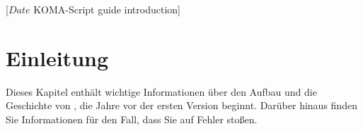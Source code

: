 %
%
%
%
%
%
%
%
% 
%
%
%
%

                 [$Date$
                  KOMA-Script guide introduction]

\chapter{Einleitung}

Dieses Kapitel enthält wichtige Informationen über
den Aufbau  und die Geschichte von
\KOMAScript, die Jahre vor der ersten Version beginnt. Darüber hinaus finden
Sie Informationen für den Fall, dass Sie %
\iffalse %
 \KOMAScript{} noch nicht installiert haben, oder %
\fi%
auf Fehler stoßen.

